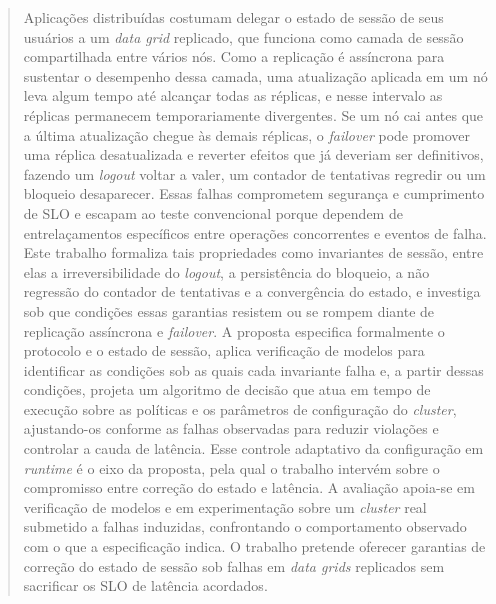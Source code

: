 \documentclass[tcc,baec]{unipampa}
\begin{document}
\begin{abstract}
Aplicações distribuídas costumam delegar o estado de sessão de seus usuários a um \emph{data grid} replicado, que funciona como camada de sessão compartilhada entre vários nós. Como a replicação é assíncrona para sustentar o desempenho dessa camada, uma atualização aplicada em um nó leva algum tempo até alcançar todas as réplicas, e nesse intervalo as réplicas permanecem temporariamente divergentes. Se um nó cai antes que a última atualização chegue às demais réplicas, o \emph{failover} pode promover uma réplica desatualizada e reverter efeitos que já deveriam ser definitivos, fazendo um \emph{logout} voltar a valer, um contador de tentativas regredir ou um bloqueio desaparecer. Essas falhas comprometem segurança e cumprimento de SLO e escapam ao teste convencional porque dependem de entrelaçamentos específicos entre operações concorrentes e eventos de falha. Este trabalho formaliza tais propriedades como invariantes de sessão, entre elas a irreversibilidade do \emph{logout}, a persistência do bloqueio, a não regressão do contador de tentativas e a convergência do estado, e investiga sob que condições essas garantias resistem ou se rompem diante de replicação assíncrona e \emph{failover}. A proposta especifica formalmente o protocolo e o estado de sessão, aplica verificação de modelos para identificar as condições sob as quais cada invariante falha e, a partir dessas condições, projeta um algoritmo de decisão que atua em tempo de execução sobre as políticas e os parâmetros de configuração do \emph{cluster}, ajustando-os conforme as falhas observadas para reduzir violações e controlar a cauda de latência. Esse controle adaptativo da configuração em \emph{runtime} é o eixo da proposta, pela qual o trabalho intervém sobre o compromisso entre correção do estado e latência. A avaliação apoia-se em verificação de modelos e em experimentação sobre um \emph{cluster} real submetido a falhas induzidas, confrontando o comportamento observado com o que a especificação indica. O trabalho pretende oferecer garantias de correção do estado de sessão sob falhas em \emph{data grids} replicados sem sacrificar os SLO de latência acordados.
\end{abstract}
\end{document}
